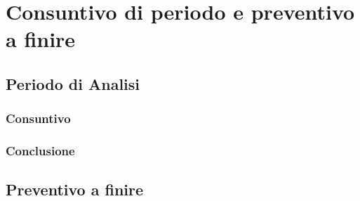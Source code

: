 \documentclass[PianoDiProgetto.tex]{subfiles}
\begin{document}
\chapter{Consuntivo di periodo e preventivo a finire}

\section{Periodo di Analisi}
\subsection{Consuntivo}
\subsection{Conclusione}

\section{Preventivo a finire}
\end{document}
